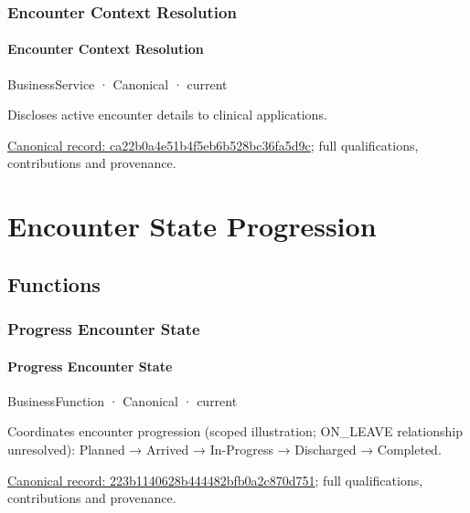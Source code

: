\subsubsection{Encounter Context Resolution}

\paragraph{Encounter Context Resolution}

\label{element:ca22b0a4e51b4f5eb6b528bc36fa5d9c}
{\small BusinessService · Canonical · current}\par

Discloses active encounter details to clinical applications.


{\footnotesize \href{../../../../continuum/business/business-service/ca22b0a4e51b4f5eb6b528bc36fa5d9c.md}{Canonical record: ca22b0a4e51b4f5eb6b528bc36fa5d9c}; full qualifications, contributions and provenance.}\par
\section{Encounter State Progression}

\subsection{Functions}

\subsubsection{Progress Encounter State}

\paragraph{Progress Encounter State}

\label{element:223b1140628b444482bfb0a2c870d751}
{\small BusinessFunction · Canonical · current}\par

Coordinates encounter progression (scoped illustration; ON\_LEAVE relationship unresolved): Planned → Arrived → In-Progress → Discharged → Completed.


{\footnotesize \href{../../../../continuum/business/business-function/223b1140628b444482bfb0a2c870d751.md}{Canonical record: 223b1140628b444482bfb0a2c870d751}; full qualifications, contributions and provenance.}\par
